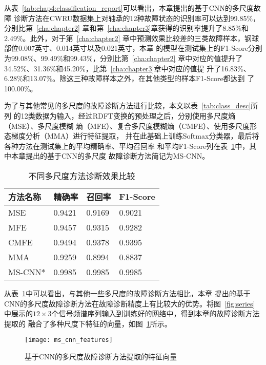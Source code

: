 从表~\ref{tab:chap4:classification_report}可以看出，本章提出的基于CNN的多尺度故障
诊断方法在CWRU数据集上对轴承的12种故障状态的识别率可以达到99.85\%，分别比第~\ref{cha:chapter2}
章和第~\ref{cha:chapter3}章获得的识别率提升了8.85\%和2.49\%。此外，对于第~\ref{cha:chapter2}
章中预测效果比较差的三类故障样本，钢球部位0.007英寸、0.014英寸以及0.021英寸，本章
的模型在测试集上的F1-Score分别为99.08\%、99.49\%和99.43\%，分别比第~\ref{cha:chapter2}
章中对应的值提升了34.52\%、31.36\%和45.20\%，比第~\ref{cha:chapter3}章中对应的值提
升了16.83\%、6.28\%和13.07\%。除这三种故障样本之外，在其他类型的样本F1-Score都达到
了100.00\%。

为了与其他常见的多尺度的故障诊断方法进行比较，本文以表~\ref{tab:class_desc}所列
的12类数据为输入，经过RDFT变换的预处理之后，分别使用多尺度熵（MSE）、多尺度模糊
熵（MFE）、复合多尺度模糊熵（CMFE）、使用多尺度形态梯度分析（MMA）进行特征提取，
并在此基础上训练Softmax分类器，最后将各种方法在测试集上的平均精确率、平均召回率
和平均F1-Score列在表~\ref{tab:chap4:comparison}中，其中本章提出的基于CNN的多尺度
故障诊断方法简记为MS-CNN。
\begin{table}[htb]
  \centering
  \begin{minipage}[t]{0.8\linewidth}
  \caption{不同多尺度方法诊断效果比较}
  \label{tab:chap4:comparison}
    \begin{tabularx}{\linewidth}{XXXX}
      \toprule[1.5pt]
        方法名称 & 精确率 & 召回率 & F1-Score \\
      \midrule[1pt]
        MSE      & 0.9421 & 0.9169 & 0.9021 \\
        MFE      & 0.9457 & 0.9315 & 0.9282 \\
        CMFE     & 0.9494 & 0.9378 & 0.9395 \\
        MMA      & 0.9259 & 0.8994 & 0.8837 \\
        MS-CNN*  & 0.9985 & 0.9985 & 0.9985 \\
      \bottomrule[1.5pt]
    \end{tabularx}
  \end{minipage}
\end{table}

从表~\ref{tab:chap4:comparison}中可以看出，与其他一些多尺度的故障诊断方法相比，本章
提出的基于CNN的多尺度故障诊断方法在故障诊断精度上有比较大的优势。将图~\ref{fig:series}
中展示的$12\times 3$个信号频谱序列输入到训练好的网络中，得到本章的故障诊断方法提取的
融合了多种尺度下特征的向量，如图~\ref{fig:ms_cnn_features}所示。
\begin{figure}[ht]
  \centering
  \texttt{[image: ms\_cnn\_features]}
  \caption{基于CNN的多尺度故障诊断方法提取的特征向量}
  \label{fig:ms_cnn_features}
\end{figure}

